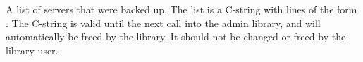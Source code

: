 A list of servers that were backed up.  The list is a C-string with lines of the
form .  The C-string is valid until the next
call into the admin library, and will automatically be freed by the library.  It
should not be changed or freed by the library user.
